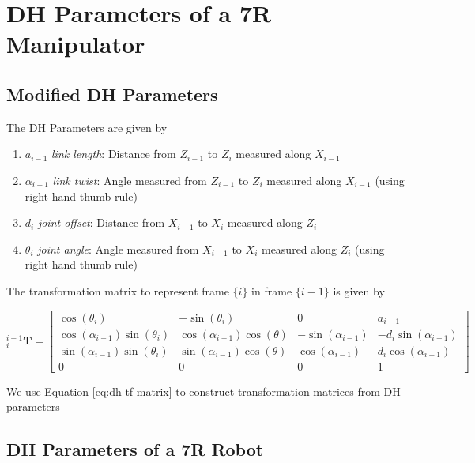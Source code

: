 
\section[A4: DH Parameters]{DH Parameters of a 7R Manipulator}

\subsection*{Modified DH Parameters}

The DH Parameters are given by

\begin{enumerate}
    \item $a_{i-1}$ \emph{link length}: Distance from $Z_{i-1}$ to $Z_i$ measured along $X_{i-1}$
    \item $\alpha_{i-1}$ \emph{link twist}: Angle measured from $Z_{i-1}$ to $Z_i$ measured along $X_{i-1}$ (using right hand thumb rule)
    \item $d_i$ \emph{joint offset}: Distance from $X_{i-1}$ to $X_i$ measured along $Z_i$
    \item $\theta_i$ \emph{joint angle}: Angle measured from $X_{i-1}$ to $X_i$ measured along $Z_i$ (using right hand thumb rule)
\end{enumerate}

The transformation matrix to represent frame $\{i\}$ in frame $\{i-1\}$ is given by

\begin{equation}
    _{i}^{i-1}\mathbf{T} = \begin{bmatrix}
        \cos(\theta_i) & -\sin(\theta_i) & 0 & a_{i-1} \\
        \cos(\alpha_{i-1}) \sin(\theta_i) & \cos(\alpha_{i-1}) \cos(\theta) & -\sin(\alpha_{i-1}) & -d_i \sin(\alpha_{i-1}) \\
        \sin(\alpha_{i-1}) \sin(\theta_i) & \sin(\alpha_{i-1}) \cos(\theta) & \cos(\alpha_{i-1}) & d_i \cos(\alpha_{i-1}) \\
        0 & 0 & 0 & 1
        \end{bmatrix}
    \label{eq:dh-tf-matrix}
\end{equation}

We use Equation \ref{eq:dh-tf-matrix} to construct transformation matrices from DH parameters

\subsection[A4.1: 7R DH Parameters]{DH Parameters of a 7R Robot}

